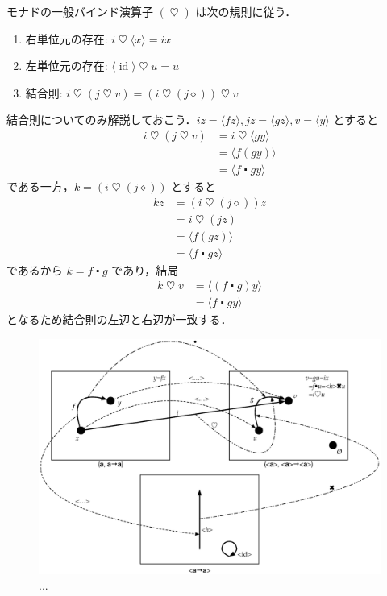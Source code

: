\documentclass[a4paper,twocolumn]{jsbook}
\newcommand{\mAnonParam}{\diamond}
\DeclareMathOperator{\mId}{id}
\DeclareMathOperator{\mBind}{\heartsuit}
\DeclareMathOperator{\mComp}{\centerdot}
\newcommand{\mPureWith}[1]{\langle#1\rangle}
\begin{document}
モナドの一般バインド演算子 $(\mBind)$ は次の規則に従う．
\begin{enumerate}
\item 右単位元の存在: $i\mBind{}\mPureWith{x}=ix$
\item 左単位元の存在: $\mPureWith{\mId}\mBind u=u$
\item 結合則: $i\mBind{}(j\mBind v)=(i\mBind{}(j\mAnonParam))\mBind v$
\end{enumerate}
結合則についてのみ解説しておこう．$iz=\mPureWith{fz},jz=\mPureWith{gz},v=\mPureWith{y}$ とすると
\begin{align}
i\mBind(j\mBind v)&=i\mBind\mPureWith{gy}\\
&=\mPureWith{f(gy)}\\
&=\mPureWith{f\mComp gy}
\end{align}
である一方，$k=(i\mBind{}(j\mAnonParam))$ とすると
\begin{align}
kz&=(i\mBind(j\mAnonParam))z\\
&=i\mBind(jz)\\
&=\mPureWith{f(gz)}\\
&=\mPureWith{f\mComp gz}
\end{align}
であるから $k=f\mComp g$ であり，結局
\begin{align}
k\mBind v&=\mPureWith{(f\mComp g)y}\\
&=\mPureWith{f\mComp gy}
\end{align}
となるため結合則の左辺と右辺が一致する．

\begin{figure}
\begin{center}
\includegraphics[width=150mm]{fig/functor.eps}
\end{center}
\caption{...}
\label{fig:functor}
\end{figure}
\end{document}
